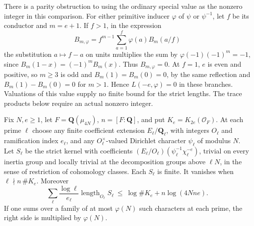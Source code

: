 There is a parity obstruction to using the ordinary special value as
the nonzero integer in this comparison. For either primitive inducer
\(\varphi\) of \(\psi\) or \(\psi^{-1}\), let \(f\) be its conductor
and \(m=e+1\). If \(f>1\), in the expression
\[
 B_{m,\varphi}=f^{m-1}\sum_{a=1}^{f}\varphi(a)B_m(a/f)
\]
the substitution \(a\mapsto f-a\) on units multiplies the sum by
\(\varphi(-1)(-1)^m=-1\), since \(B_m(1-x)=(-1)^m B_m(x)\).
Thus \(B_{m,\varphi}=0\). At \(f=1\), \(e\) is even and positive,
so \(m\ge3\) is odd and \(B_m(1)=B_m(0)=0\), by the same reflection
and \(B_m(1)-B_m(0)=0\) for \(m>1\). Hence \(L(-e,\varphi)=0\)
in these branches. Valuations of this value supply no finite bound
for the strict lengths. The trace products below require an actual
nonzero integer.

\begin{proposition}
\label{newcoh:fullsupport}
Fix \(N,e\ge1\), let \(F=\mathbf Q(\mu_{4N})\), \(n=[F:\mathbf Q]\),
and put \(K_e=K_{2e}(\mathcal O_F)\). At each prime \(\ell\) choose
any finite coefficient extension \(E_\ell/\mathbf Q_\ell\), with
integers \(O_\ell\) and ramification index \(e_\ell\), and any
\(O_\ell^\times\)-valued Dirichlet character \(\psi_\ell\) of
modulus \(N\). Let \(S_\ell\) be the strict kernel with coefficients
\((E_\ell/O_\ell)(\psi_\ell^{-1}\chi_\ell^{-e})\), trivial on every
inertia group and locally trivial at the decomposition groups above
\(\ell N\), in the sense of restriction of cohomology classes.
Each \(S_\ell\) is finite. It vanishes when
\(\ell\nmid n\,\#K_e\). Moreover
\[
 \sum_{\ell}\frac{\log\ell}{e_\ell}\operatorname{length}_{O_\ell}S_\ell
 \ \le\ \log\#K_e+n\log(4Nne).
\]
If one sums over a family of at most \(\varphi(N)\) such characters
at each prime, the right side is multiplied by \(\varphi(N)\).
\end{proposition}
